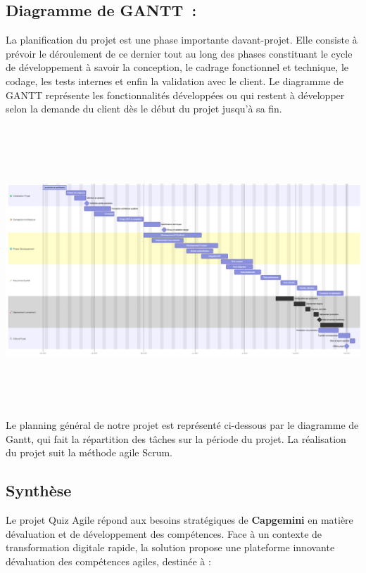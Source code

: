 \documentclass[12pt,a4paper,twoside]{report}
\begin{document}
\hypertarget{diagramme-de-gantt}{%
\subsection{Diagramme de GANTT~:}\label{diagramme-de-gantt}}

La planification du projet est une phase importante
d\textquotesingle avant-projet. Elle consiste à prévoir le déroulement
de ce dernier tout au long des phases constituant le cycle de
développement à savoir la conception, le cadrage fonctionnel et
technique, le codage, les tests internes et enfin la validation avec le
client. Le diagramme de GANTT représente les fonctionnalités développées
ou qui restent à développer selon la demande du client dès le début du
projet jusqu'à sa fin.~

\includegraphics[width=6.3in,height=4.29077in]{latex_media/media/image10.png}Le
planning général de notre projet est représenté ci-dessous par le
diagramme de Gantt, qui fait la répartition des tâches sur la période du
projet. La réalisation du projet suit la méthode agile Scrum.~

\hypertarget{synthuxe8se}{%
\subsection{Synthèse}\label{synthuxe8se}}

Le projet Quiz Agile répond aux besoins stratégiques de
\textbf{Capgemini} en matière d\textquotesingle évaluation et de
développement des compétences. Face à un contexte de transformation
digitale rapide, la solution propose une plateforme innovante
d\textquotesingle évaluation des compétences agiles, destinée à :
\end{document}
